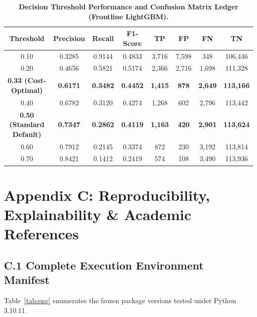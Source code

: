 \documentclass[10pt,a4paper]{article}
\begin{document}
\vspace{-2pt}
\begin{table}[h!]
\centering
\renewcommand{\arraystretch}{0.74}
\caption{\textbf{Decision Threshold Performance and Confusion Matrix Ledger (Frontline LightGBM).}}
\label{tab:threshold_audit}
\vspace{1pt}
\begin{tabularx}{\linewidth}{@{}cccccccc@{}}
\toprule
\textbf{Threshold} & \textbf{Precision} & \textbf{Recall} & \textbf{F1-Score} & \textbf{TP} & \textbf{FP} & \textbf{FN} & \textbf{TN} \\
\midrule
0.10 & 0.3285 & 0.9144 & 0.4833 & 3,716 & 7,598 & 348 & 106,446 \\
0.20 & 0.4656 & 0.5821 & 0.5174 & 2,366 & 2,716 & 1,698 & 111,328 \\
\textbf{0.33 (Cost-Optimal)} & \textbf{0.6171} & \textbf{0.3482} & \textbf{0.4452} & \textbf{1,415} & \textbf{878} & \textbf{2,649} & \textbf{113,166} \\
0.40 & 0.6782 & 0.3120 & 0.4274 & 1,268 & 602 & 2,796 & 113,442 \\
\textbf{0.50 (Standard Default)} & \textbf{0.7347} & \textbf{0.2862} & \textbf{0.4119} & \textbf{1,163} & \textbf{420} & \textbf{2,901} & \textbf{113,624} \\
0.60 & 0.7912 & 0.2145 & 0.3374 & 872 & 230 & 3,192 & 113,814 \\
0.70 & 0.8421 & 0.1412 & 0.2419 & 574 & 108 & 3,490 & 113,936 \\
\bottomrule
\end{tabularx}
\end{table}

\clearpage


\section*{Appendix C: Reproducibility, Explainability \& Academic References}

\subsection*{C.1 Complete Execution Environment Manifest}
Table~\ref{tab:env} enumerates the frozen package versions tested under Python 3.10.11.
\end{document}
